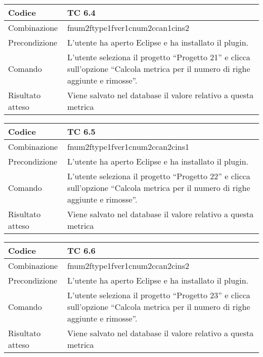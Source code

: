 \begin{table}[ht]
\begin{tabular}{|p{3cm}|p{9cm}|}
\hline
\cellcolor{lightgray}Codice				& TC 6.4								\\
\hline
\cellcolor{lightgray}Combinazione		& fnum2ftype1fver1cnum2ccan1cins2								\\
\hline
\cellcolor{lightgray}Precondizione		& L'utente ha aperto Eclipse e ha installato il plugin.				\\
\hline
\cellcolor{lightgray}Comando			& L'utente seleziona il progetto ``Progetto 21''  e clicca sull'opzione ``Calcola metrica per il numero di righe aggiunte e rimosse''.	\\
\hline
\cellcolor{lightgray}Risultato atteso	& Viene salvato nel database il valore relativo a questa metrica	\\
\hline
\end{tabular}
\end{table}

\begin{table}[ht]
\begin{tabular}{|p{3cm}|p{9cm}|}
\hline
\cellcolor{lightgray}Codice				& TC 6.5								\\
\hline
\cellcolor{lightgray}Combinazione		& fnum2ftype1fver1cnum2ccan2cins1							\\
\hline
\cellcolor{lightgray}Precondizione		& L'utente ha aperto Eclipse e ha installato il plugin.									\\
\hline
\cellcolor{lightgray}Comando			& L'utente seleziona il progetto ``Progetto 22''  e clicca sull'opzione ``Calcola metrica per il numero di righe aggiunte e rimosse''.	\\
\hline
\cellcolor{lightgray}Risultato atteso	& Viene salvato nel database il valore relativo a questa metrica	\\
\hline
\end{tabular}
\end{table}

\begin{table}[ht]
\begin{tabular}{|p{3cm}|p{9cm}|}
\hline
\cellcolor{lightgray}Codice				& TC 6.6								\\
\hline
\cellcolor{lightgray}Combinazione		& fnum2ftype1fver1cnum2ccan2cins2 									\\
\hline
\cellcolor{lightgray}Precondizione		& L'utente ha aperto Eclipse e ha installato il plugin.				\\
\hline
\cellcolor{lightgray}Comando			& L'utente seleziona il progetto ``Progetto 23''  e clicca sull'opzione ``Calcola metrica per il numero di righe aggiunte e rimosse''.	\\
\hline
\cellcolor{lightgray}Risultato atteso	& Viene salvato nel database il valore relativo a questa metrica	\\
\hline
\end{tabular}
\end{table}

